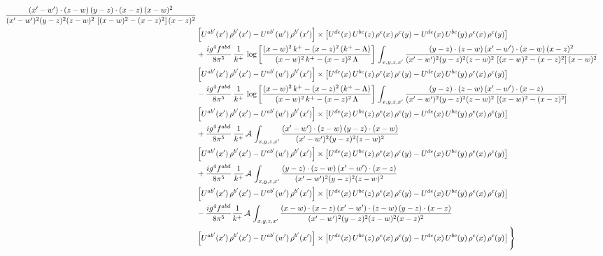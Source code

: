 \documentclass[9pt]{article}
\numberwithin{equation}{section}
\begin{document}
\begin{align}
\frac{(x'-w')\cdot(z-w)\,(y-z)\cdot(x-z)\,(x-w)^{2}}{(x'-w')^{2}(y-z)^{2}(z-w)^{2}\,\left[(x-w)^{2}-(x-z)^{2}\right](x-z)^{2}}\notag \\ & \left[U^{ab'}(x')\,\rho^{b'}(x')-U^{ab'}(w')\, \rho^{b'}(x')\right]\times \left[U^{de}(x)\,U^{bc}(z)\, \rho^{e}(x)\,\rho^{c}(y)-U^{de}(x)\,U^{bc}(y)\,\rho^{e}(x)\,\rho^{c}(y)\right]\notag \\ & +\frac{ig^{4}f^{abd}}{8\pi^{5}}\,\frac{1}{k^{+}}\,\log{\left[\frac{(x-w)^{2}\,k^{+}-(x-z)^{2}\,(k^{+}-\Lambda)}{(x-w)^{2}\,k^{+}-(x-z)^{2}\,\Lambda}\right]}\,\int_{x,y,z,x'}
\frac{(y-z)\cdot(z-w)\,(x'-w')\cdot(x-w)\,(x-z)^{2}}{(x'-w')^{2}(y-z)^{2}(z-w)^{2}\,\left[(x-w)^{2}-(x-z)^{2}\right](x-w)^{2}}\notag \\ 
& \left[U^{ab'}(x')\,\rho^{b'}(x')-U^{ab'}(w')\, \rho^{b'}(x')\right]\times \left[U^{de}(x)\,U^{bc}(z)\, \rho^{e}(x)\,\rho^{c}(y)-U^{de}(x)\,U^{bc}(y)\,\rho^{e}(x)\,\rho^{c}(y)\right]\notag \\ & -\frac{ig^{4}f^{abd}}{8\pi^{5}}\,\frac{1}{k^{+}}\,\log{\left[\frac{(x-w)^{2}\,k^{+}-(x-z)^{2}\,(k^{+}-\Lambda)}{(x-w)^{2}\,k^{+}-(x-z)^{2}\,\Lambda}\right]}\,\int_{x,y,z,x'}
\frac{(y-z)\cdot(z-w)\,(x'-w')\cdot(x-z)}{(x'-w')^{2}(y-z)^{2}(z-w)^{2}\,\left[(x-w)^{2}-(x-z)^{2}\right]}\notag \\ & \left[U^{ab'}(x')\,\rho^{b'}(x')-U^{ab'}(w')\, \rho^{b'}(x')\right]\times \left[U^{de}(x)\,U^{bc}(z)\, \rho^{e}(x)\,\rho^{c}(y)-U^{de}(x)\,U^{bc}(y)\,\rho^{e}(x)\,\rho^{c}(y)\right]\notag \\ & +\frac{ig^{4}f^{abd}}{8\pi^{5}}\,\frac{1}{k^{+}}\,\mathcal{A}\,\int_{x,y,z,x'}
\frac{(x'-w')\cdot(z-w)\,(y-z)\cdot(x-w)}{(x'-w')^{2}(y-z)^{2}(z-w)^{2}}\notag \\
& \left[U^{ab'}(x')\,\rho^{b'}(x')-U^{ab'}(w')\, \rho^{b'}(x')\right]\times \left[U^{de}(x)\,U^{bc}(z)\, \rho^{e}(x)\,\rho^{c}(y)-U^{de}(x)\,U^{bc}(y)\,\rho^{e}(x)\,\rho^{c}(y)\right]\notag \\ & +\frac{ig^{4}f^{abd}}{8\pi^{5}}\,\frac{1}{k^{+}}\,\mathcal{A}\,\int_{x,y,z,x'}
\frac{(y-z)\cdot(z-w)\,(x'-w')\cdot(x-z)}{(x'-w')^{2}(y-z)^{2}(z-w)^{2}}\notag \\ & \left[U^{ab'}(x')\,\rho^{b'}(x')-U^{ab'}(w')\, \rho^{b'}(x')\right]\times \left[U^{de}(x)\,U^{bc}(z)\, \rho^{e}(x)\,\rho^{c}(y)-U^{de}(x)\,U^{bc}(y)\,\rho^{e}(x)\,\rho^{c}(y)\right]\notag \\ & -\frac{ig^{4}f^{abd}}{8\pi^{5}}\frac{1}{k^{+}}\,\mathcal{A}\,\int_{x,y,z,x'}
\frac{(x-w)\cdot(x-z)\,(x'-w')\cdot(z-w)\,(y-z)\cdot(x-z)}{(x'-w')^{2}(y-z)^{2}(z-w)^{2}(x-z)^{2}}\notag \\ & \left[U^{ab'}(x')\,\rho^{b'}(x')-U^{ab'}(w')\, \rho^{b'}(x')\right]\times \left[U^{de}(x)\,U^{bc}(z)\, \rho^{e}(x)\,\rho^{c}(y)-U^{de}(x)\,U^{bc}(y)\,\rho^{e}(x)\,\rho^{c}(y)\right]\Bigg\}
\end{align}
\end{document}
